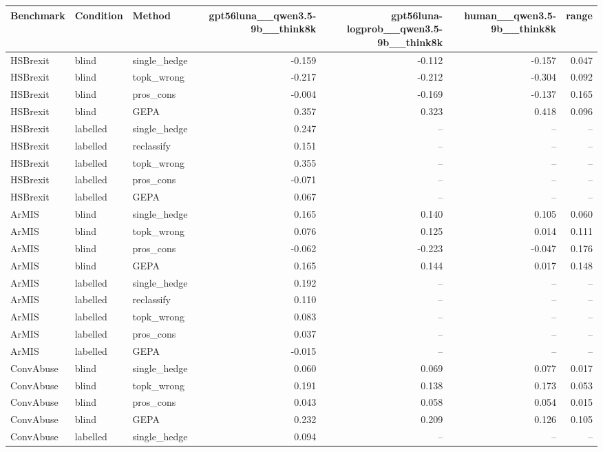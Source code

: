 \begin{table}[t]
\centering
\small
\begin{tabular}{lllrrrr}
\hline
Benchmark & Condition & Method & gpt56luna\_\_qwen3.5-9b\_\_think8k & gpt56luna-logprob\_\_qwen3.5-9b\_\_think8k & human\_\_qwen3.5-9b\_\_think8k & range \\
\hline
HSBrexit & blind & single\_hedge & -0.159 & -0.112 & -0.157 & 0.047 \\
HSBrexit & blind & topk\_wrong & -0.217 & -0.212 & -0.304 & 0.092 \\
HSBrexit & blind & pros\_cons & -0.004 & -0.169 & -0.137 & 0.165 \\
HSBrexit & blind & GEPA & 0.357 & 0.323 & 0.418 & 0.096 \\
HSBrexit & labelled & single\_hedge & 0.247 & -- & -- & -- \\
HSBrexit & labelled & reclassify & 0.151 & -- & -- & -- \\
HSBrexit & labelled & topk\_wrong & 0.355 & -- & -- & -- \\
HSBrexit & labelled & pros\_cons & -0.071 & -- & -- & -- \\
HSBrexit & labelled & GEPA & 0.067 & -- & -- & -- \\
ArMIS & blind & single\_hedge & 0.165 & 0.140 & 0.105 & 0.060 \\
ArMIS & blind & topk\_wrong & 0.076 & 0.125 & 0.014 & 0.111 \\
ArMIS & blind & pros\_cons & -0.062 & -0.223 & -0.047 & 0.176 \\
ArMIS & blind & GEPA & 0.165 & 0.144 & 0.017 & 0.148 \\
ArMIS & labelled & single\_hedge & 0.192 & -- & -- & -- \\
ArMIS & labelled & reclassify & 0.110 & -- & -- & -- \\
ArMIS & labelled & topk\_wrong & 0.083 & -- & -- & -- \\
ArMIS & labelled & pros\_cons & 0.037 & -- & -- & -- \\
ArMIS & labelled & GEPA & -0.015 & -- & -- & -- \\
ConvAbuse & blind & single\_hedge & 0.060 & 0.069 & 0.077 & 0.017 \\
ConvAbuse & blind & topk\_wrong & 0.191 & 0.138 & 0.173 & 0.053 \\
ConvAbuse & blind & pros\_cons & 0.043 & 0.058 & 0.054 & 0.015 \\
ConvAbuse & blind & GEPA & 0.232 & 0.209 & 0.126 & 0.105 \\
ConvAbuse & labelled & single\_hedge & 0.094 & -- & -- & -- \\

\end{tabular}
\end{table}
